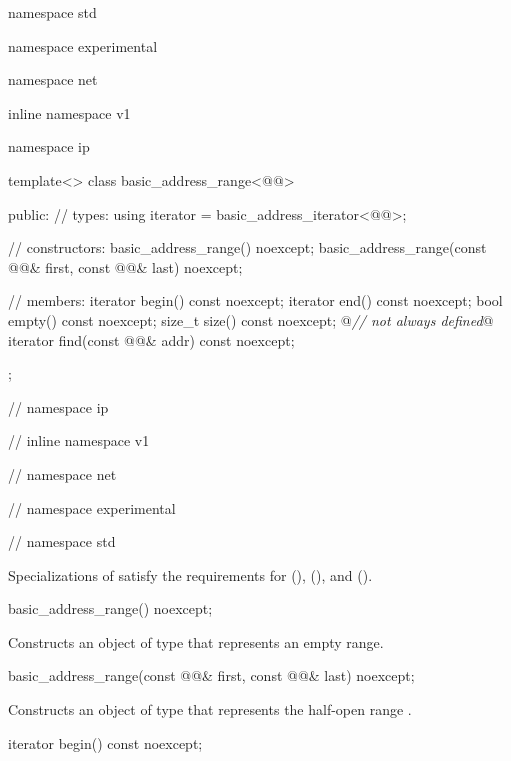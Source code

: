 \begin{codeblock}
namespace std {
namespace experimental {
namespace net {
inline namespace v1 {
namespace ip {

  template<> class basic_address_range<@@>
  {
  public:
    // types:
    using iterator = basic_address_iterator<@@>;

    // constructors:
    basic_address_range() noexcept;
    basic_address_range(const @@& first,
                        const @@& last) noexcept;

    // members:
    iterator begin() const noexcept;
    iterator end() const noexcept;
    bool empty() const noexcept;
    size_t size() const noexcept; @\textit{// not always defined}@
    iterator find(const @@& addr) const noexcept;
  };

} // namespace ip
} // inline namespace v1
} // namespace net
} // namespace experimental
} // namespace std
\end{codeblock}

\pnum
Specializations of  satisfy the requirements for  (),  (), and  ().

\begin{itemdecl}
basic_address_range() noexcept;
\end{itemdecl}

\begin{itemdescr}
\pnum
\effects Constructs an object of type  that represents an empty range.
\end{itemdescr}

\begin{itemdecl}
basic_address_range(const @@& first,
                    const @@& last) noexcept;
\end{itemdecl}

\begin{itemdescr}
\pnum
\effects Constructs an object of type  that represents the half-open range .
\end{itemdescr}

\begin{itemdecl}
iterator begin() const noexcept;
\end{itemdecl}

